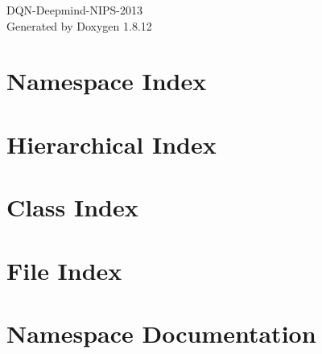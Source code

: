 \documentclass[twoside]{book}
\newcommand{\+}{\discretionary{\mbox{\scriptsize$\hookleftarrow$}}{}{}}
\newcommand{\clearemptydoublepage}{%
  \newpage{\pagestyle{empty}\cleardoublepage}%
}
\begin{document}
\hypersetup{pageanchor=false,
             bookmarksnumbered=true,
             pdfencoding=unicode
            }
\begin{titlepage}
\vspace*{7cm}
\begin{center}%
{\Large D\+Q\+N-\/\+Deepmind-\/\+N\+I\+P\+S-\/2013 }\\
\vspace*{1cm}
{\large Generated by Doxygen 1.8.12}\\
\end{center}
\end{titlepage}
\clearemptydoublepage
{}
\tableofcontents
\clearemptydoublepage
{}
\hypersetup{pageanchor=true}

\chapter{Namespace Index}

\chapter{Hierarchical Index}

\chapter{Class Index}

\chapter{File Index}

\chapter{Namespace Documentation}













\end{document}
